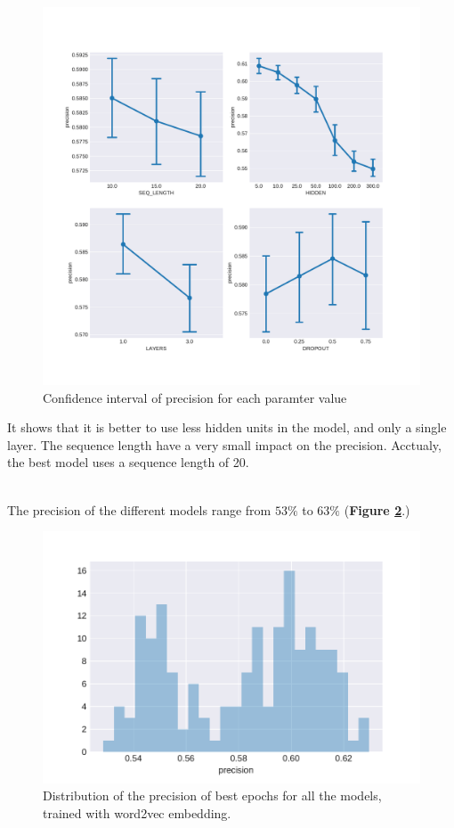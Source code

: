 \begin{figure}
	\centering
	\includegraphics[width=\textwidth]{images/chapitre4/confInt_precision_liar_attention_word2vec}
	\caption{Confidence interval of precision for each paramter value}
	\label{fig:chap4:att1:confInt}
\end{figure}

It shows that it is better to use less hidden units in the model, and only a single layer. The sequence length have a very small impact on the precision. Acctualy, the best model uses a sequence length of 20. \\\

The precision of the different models range from $53\%$ to $63\%$ (\textbf{Figure \ref{fig:chap4:att1:distPrecision}}.)

\begin{figure}
	\centering
	\includegraphics[width=\textwidth]{images/chapitre4/distplot_precision_liar_attention_word2vec}
	\caption{Distribution of the precision of best epochs for all the models, trained with word2vec embedding.}
	\label{fig:chap4:att1:distPrecision}
\end{figure}

